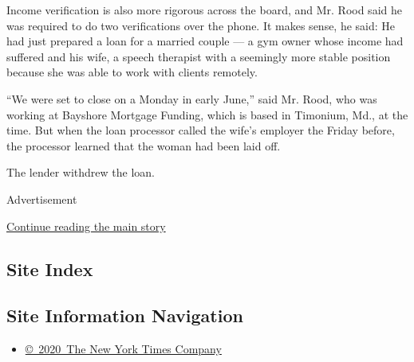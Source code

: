 Income verification is also more rigorous across the board, and Mr. Rood
said he was required to do two verifications over the phone. It makes
sense, he said: He had just prepared a loan for a married couple --- a
gym owner whose income had suffered and his wife, a speech therapist
with a seemingly more stable position because she was able to work with
clients remotely.

``We were set to close on a Monday in early June,'' said Mr. Rood, who
was working at Bayshore Mortgage Funding, which is based in Timonium,
Md., at the time. But when the loan processor called the wife's employer
the Friday before, the processor learned that the woman had been laid
off.

The lender withdrew the loan.

Advertisement

\protect\hyperlink{after-bottom}{Continue reading the main story}

\hypertarget{site-index}{%
\subsection{Site Index}\label{site-index}}

\hypertarget{site-information-navigation}{%
\subsection{Site Information
Navigation}\label{site-information-navigation}}

\begin{itemize}
\tightlist
\item
  \href{https://help.nytimes3xbfgragh.onion/hc/en-us/articles/115014792127-Copyright-notice}{©~2020~The
  New York Times Company}
\end{itemize}

